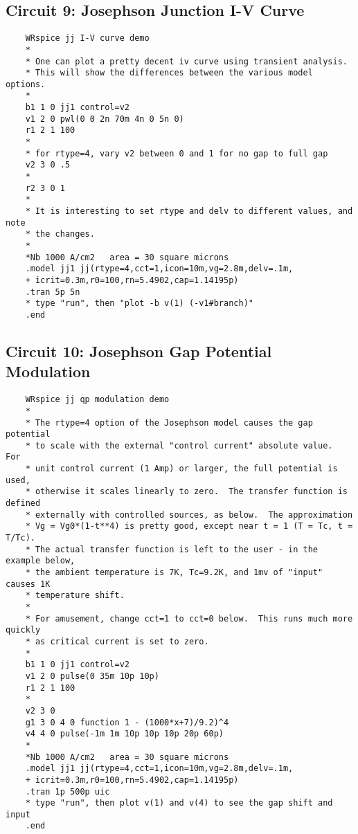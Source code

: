 \subsection{Circuit 9:  Josephson Junction I-V Curve}


\begin{verbatim}
    WRspice jj I-V curve demo
    *
    * One can plot a pretty decent iv curve using transient analysis.
    * This will show the differences between the various model options.
    *
    b1 1 0 jj1 control=v2
    v1 2 0 pwl(0 0 2n 70m 4n 0 5n 0)
    r1 2 1 100
    *
    * for rtype=4, vary v2 between 0 and 1 for no gap to full gap
    v2 3 0 .5
    *
    r2 3 0 1
    *
    * It is interesting to set rtype and delv to different values, and note
    * the changes.
    *
    *Nb 1000 A/cm2   area = 30 square microns
    .model jj1 jj(rtype=4,cct=1,icon=10m,vg=2.8m,delv=.1m,
    + icrit=0.3m,r0=100,rn=5.4902,cap=1.14195p)
    .tran 5p 5n
    * type "run", then "plot -b v(1) (-v1#branch)"
    .end
\end{verbatim}

\subsection{Circuit 10: Josephson Gap Potential Modulation}


\begin{verbatim}
    WRspice jj qp modulation demo
    *
    * The rtype=4 option of the Josephson model causes the gap potential
    * to scale with the external "control current" absolute value.  For
    * unit control current (1 Amp) or larger, the full potential is used,
    * otherwise it scales linearly to zero.  The transfer function is defined
    * externally with controlled sources, as below.  The approximation
    * Vg = Vg0*(1-t**4) is pretty good, except near t = 1 (T = Tc, t = T/Tc).
    * The actual transfer function is left to the user - in the example below,
    * the ambient temperature is 7K, Tc=9.2K, and 1mv of "input" causes 1K
    * temperature shift.
    *
    * For amusement, change cct=1 to cct=0 below.  This runs much more quickly
    * as critical current is set to zero.
    *
    b1 1 0 jj1 control=v2
    v1 2 0 pulse(0 35m 10p 10p)
    r1 2 1 100
    *
    v2 3 0
    g1 3 0 4 0 function 1 - (1000*x+7)/9.2)^4
    v4 4 0 pulse(-1m 1m 10p 10p 10p 20p 60p)
    *
    *Nb 1000 A/cm2   area = 30 square microns
    .model jj1 jj(rtype=4,cct=1,icon=10m,vg=2.8m,delv=.1m,
    + icrit=0.3m,r0=100,rn=5.4902,cap=1.14195p)
    .tran 1p 500p uic
    * type "run", then plot v(1) and v(4) to see the gap shift and input
    .end
\end{verbatim}

